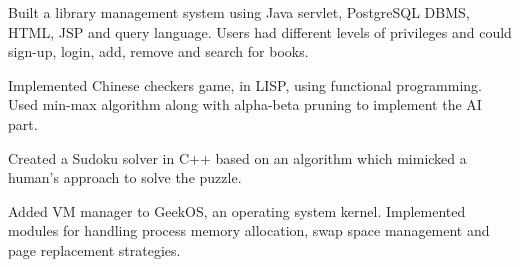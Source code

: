 



\begin{cventries}

  \cvproject
    {
      \begin{cvitems} %
         \item{ Built a library management system using Java servlet, PostgreSQL DBMS, HTML, JSP and query language. Users  had different levels of privileges and could sign-up, login, add, remove and search for books.}
		\item{ Implemented Chinese checkers game, in LISP, using functional programming. Used min-max algorithm along with alpha-beta pruning to implement the AI part.}
		\item{Created a Sudoku solver in C++ based on an algorithm which mimicked a human’s approach to solve the puzzle.}
		\item{ Added VM manager to GeekOS, an operating system kernel. Implemented modules for handling process memory allocation, swap space management and page replacement strategies. }
      \end{cvitems}
    }

\end{cventries}